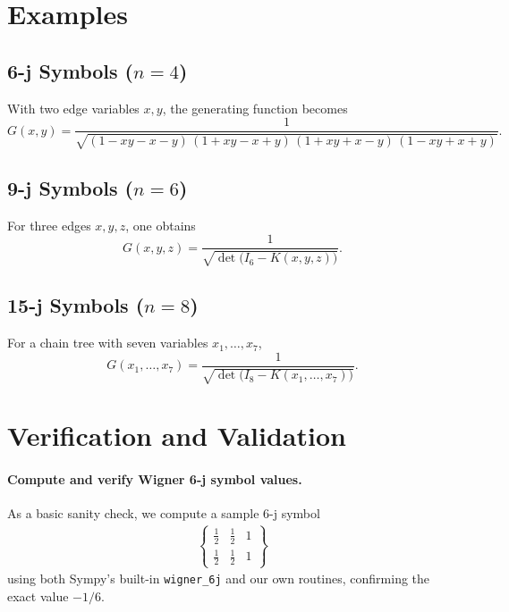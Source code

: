 \documentclass[11pt]{article}
\begin{document}
\section{Examples}
\subsection{6-j Symbols ($n=4$)}
With two edge variables $x,y$, the generating function becomes
\begin{equation}\label{eq:6j}
  \boxed{
  G(x,y)
  = \frac{1}{\sqrt{(1 - x y - x - y)\,(1 + x y - x + y)\,(1 + x y + x - y)\,(1 - x y + x + y)}}.
  }
\end{equation}

\subsection{9-j Symbols ($n=6$)}
For three edges $x,y,z$, one obtains
\begin{equation}\label{eq:9j}
  \boxed{
  G(x,y,z)
  = \frac{1}{\sqrt{\det\!\bigl(I_6 - K(x,y,z)\bigr)}}.
  }
\end{equation}

\subsection{15-j Symbols ($n=8$)}
For a chain tree with seven variables $x_1,\dots,x_7$,
\begin{equation}\label{eq:15j}
  \boxed{
  G(x_1,\dots,x_7)
  = \frac{1}{\sqrt{\det\!\bigl(I_8 - K(x_1,\dots,x_7)\bigr)}}.
  }
\end{equation}

\section{Verification and Validation}
\paragraph{Compute and verify Wigner 6-j symbol values.}
As a basic sanity check, we compute a sample 6-j symbol
\begin{align*}
  \begin{Bmatrix}
    \tfrac12 & \tfrac12 & 1 \\[4pt]
    \tfrac12 & \tfrac12 & 1
  \end{Bmatrix}
\end{align*}
using both Sympy’s built-in \texttt{wigner\_6j} and our own routines, confirming the exact value $-1/6$.\medskip
\end{document}
